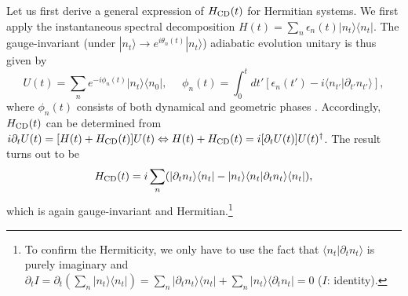 \documentclass{tADP2e}
\theoremstyle{plain}
\theoremstyle{plain}
\theoremstyle{definition}
\begin{document}
Let us first derive a general expression of $H_{\rm CD}(t)$ for Hermitian systems. We first apply the instantaneous spectral decomposition $H(t)=\sum_n\epsilon_n(t)|n_t\rangle\langle n_t|$. The gauge-invariant (under $|n_t\rangle\to e^{i\theta_n(t)}|n_t\rangle$) adiabatic evolution unitary is thus given by
\begin{equation}
U(t)=\sum_n e^{-i\phi_n(t)} |n_t\rangle\langle n_0|,\;\;\;\;\
\phi_n(t)=\int^t_0dt'[\epsilon_n(t')-i\langle n_{t'}|\partial_{t'} n_{t'}\rangle],
\end{equation}
where $\phi_n(t)$ consists of both dynamical and geometric phases \cite{BMV84}. Accordingly, $H_{\rm CD}(t)$ can be determined from $i\partial_t U(t)=[H(t)+H_{\rm CD}(t)] U(t)\Leftrightarrow H(t)+H_{\rm CD}(t)=i  [\partial_t U(t)] U(t)^\dag$. The result turns out to be
\begin{equation}
H_{\rm CD}(t)=i\sum_n(|\partial_t n_t\rangle \langle n_t| - |n_t\rangle\langle n_t|\partial_t n_t\rangle\langle n_t|),
\label{HCD}
\end{equation}
which is again gauge-invariant and Hermitian.\footnote{To confirm the Hermiticity, we only have to use the fact that $\langle n_t|\partial_t n_t\rangle$ is purely imaginary and $\partial_t I=\partial_t(\sum_n|n_t\rangle\langle n_t|)=\sum_n|\partial_t n_t\rangle\langle n_t|+\sum_n|n_t\rangle\langle \partial_t n_t|=0$ ($I$: identity).}
\end{document}
